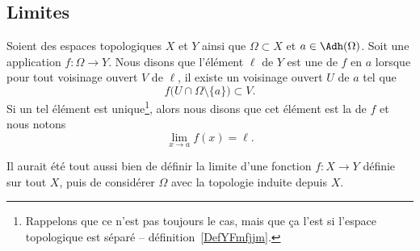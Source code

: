 \subsection{Limites}

\begin{definition}\label{DefYNVoWBx}
    Soient des espaces topologiques \( X\) et \( Y\) ainsi que \( \Omega\subset X\) et \( a\in \Adh(\Omega)\). Soit une application \( f\colon \Omega\to Y\). Nous disons que l'élément \( \ell\) de \( Y\) est une  de \( f\) en \( a\) lorsque pour tout voisinage ouvert \( V\) de \( \ell\), il existe un voisinage ouvert \( U\) de \( a\) tel que
    \begin{equation}        \label{EQooXLJJooZDcOtU}
        f\big( U\cap\Omega\setminus\{ a \} \big)\subset V.
    \end{equation}
    Si un tel élément est unique\footnote{Rappelons que ce n'est pas toujours le cas, mais que ça l'est si l'espace topologique est séparé -- définition~\ref{DefYFmfjjm}.}, alors nous disons que cet élément est la  de \( f\) et nous notons
    \begin{equation}
        \lim_{x\to a} f(x)=\ell.
    \end{equation}
\end{definition}

\begin{normaltext}
    Il aurait été tout aussi bien de définir la limite d'une fonction \( f\colon X\to Y\) définie sur tout \( X\), puis de considérer \( \Omega\) avec la topologie induite depuis \( X\).
\end{normaltext}

